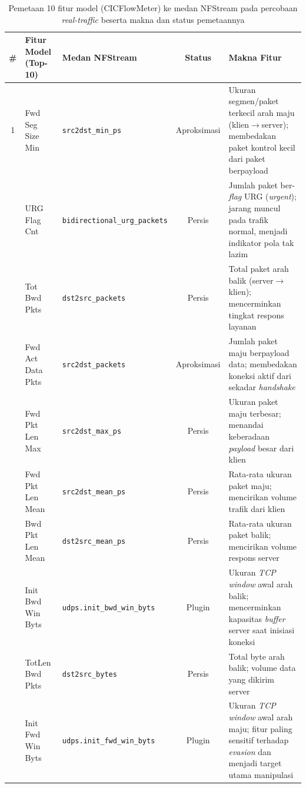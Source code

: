 \documentclass[10pt,twocolumn,a4paper]{extarticle}
\begin{document}
\begin{table}[htbp]
\caption{Pemetaan 10 fitur model (CICFlowMeter) ke medan NFStream pada percobaan \textit{real-traffic} beserta makna dan status pemetaannya}
\label{tab:mapping}
\centering
\footnotesize
\begin{tabularx}{\textwidth}{@{} c l l c X @{}}
\toprule
\textbf{\#} & \textbf{Fitur Model (Top-10)} & \textbf{Medan NFStream} & \textbf{Status} & \textbf{Makna Fitur} \\ \midrule
1 & Fwd Seg Size Min & \texttt{src2dst\_min\_ps} & Aproksimasi & Ukuran segmen/paket terkecil arah maju (klien$\rightarrow$server); membedakan paket kontrol kecil dari paket berpayload \\ \addlinespace
2 & URG Flag Cnt & \texttt{bidirectional\_urg\_packets} & Persis & Jumlah paket ber-\textit{flag} URG (\textit{urgent}); jarang muncul pada trafik normal, menjadi indikator pola tak lazim \\ \addlinespace
3 & Tot Bwd Pkts & \texttt{dst2src\_packets} & Persis & Total paket arah balik (server$\rightarrow$klien); mencerminkan tingkat respons layanan \\ \addlinespace
4 & Fwd Act Data Pkts & \texttt{src2dst\_packets} & Aproksimasi & Jumlah paket maju berpayload data; membedakan koneksi aktif dari sekadar \textit{handshake} \\ \addlinespace
5 & Fwd Pkt Len Max & \texttt{src2dst\_max\_ps} & Persis & Ukuran paket maju terbesar; menandai keberadaan \textit{payload} besar dari klien \\ \addlinespace
6 & Fwd Pkt Len Mean & \texttt{src2dst\_mean\_ps} & Persis & Rata-rata ukuran paket maju; mencirikan volume trafik dari klien \\ \addlinespace
7 & Bwd Pkt Len Mean & \texttt{dst2src\_mean\_ps} & Persis & Rata-rata ukuran paket balik; mencirikan volume respons server \\ \addlinespace
8 & Init Bwd Win Byts & \texttt{udps.init\_bwd\_win\_byts} & Plugin & Ukuran \textit{TCP window} awal arah balik; mencerminkan kapasitas \textit{buffer} server saat inisiasi koneksi \\ \addlinespace
9 & TotLen Bwd Pkts & \texttt{dst2src\_bytes} & Persis & Total byte arah balik; volume data yang dikirim server \\ \addlinespace
10 & Init Fwd Win Byts & \texttt{udps.init\_fwd\_win\_byts} & Plugin & Ukuran \textit{TCP window} awal arah maju; fitur paling sensitif terhadap \textit{evasion} dan menjadi target utama manipulasi \\ \bottomrule
\end{tabularx}
\end{table}
\end{document}
